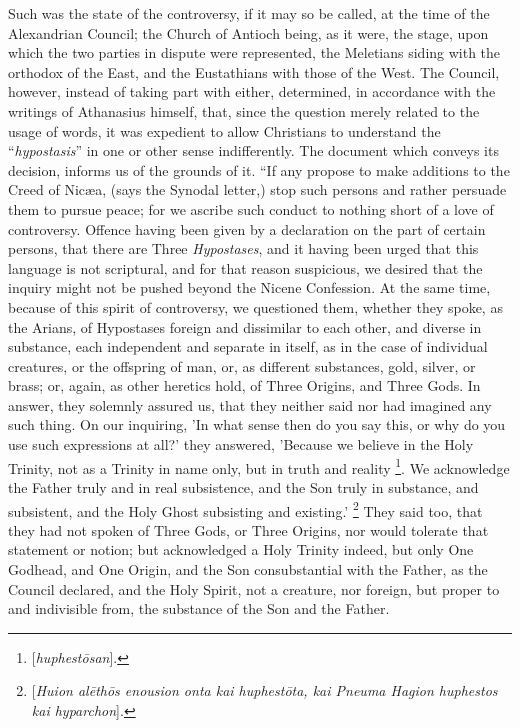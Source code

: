 Such was the state of the controversy, if it may so be
called, at the time of the Alexandrian Council; the Church of Antioch
being, as it were, the stage, upon which the two parties in dispute
were represented, the Meletians siding with the orthodox of the East,
and the Eustathians with those of the West. The Council, however,
instead of taking part with either, determined, in accordance with the
writings of Athanasius himself, that, since the question merely
related to the usage of words, it was expedient to allow Christians to
understand the ``\emph{hypostasis}'' in one or other sense
indifferently. The document which conveys its decision, informs us of
the grounds of it. ``If any propose to make additions to the Creed
of Nicæa, (says the Synodal letter,) stop such persons and rather
persuade them to pursue peace; for we ascribe such conduct to nothing
short of a love of controversy. Offence having been given by a
declaration on the part of certain persons, that there are Three \emph{Hypostases},
and it having been urged that this language is not scriptural, and for
that reason suspicious, we desired that the inquiry might not be
pushed beyond the Nicene Confession. At the same time, because of this
spirit of controversy, we questioned them, whether they spoke, as the
Arians, of Hypostases foreign and dissimilar to each other, and
diverse in substance, each independent and separate in itself, as in
the case of individual creatures, or the offspring of man, or, as
different substances, gold, silver, or brass; or, again, as other
heretics hold, of Three Origins, and Three Gods. In answer, they
solemnly assured us, that they neither said nor had imagined any such
thing. On our inquiring, 'In what sense then do you say this, or why
do you use such expressions at all?' they answered, 'Because we
believe in the Holy Trinity, not as a Trinity in name only, but in
truth and reality \footnote{[\emph{huphest\={o}san}].}. We
acknowledge the Father truly and in real subsistence, and the Son
truly in substance, and subsistent, and the Holy Ghost subsisting and
existing.' \footnote{[\emph{Huion al\={e}th\={o}s enousion
onta kai huphest\={o}ta, kai Pneuma Hagion huphestos kai hyparchon}].} They said
too, that they had not spoken of Three Gods, or Three Origins, nor
would tolerate that statement or notion; but acknowledged a Holy
Trinity indeed, but only One Godhead, and One Origin, and the Son
consubstantial with the Father, as the Council declared, and the Holy
Spirit, not a creature, nor foreign, but proper to and indivisible
from, the substance of the Son and the Father.

